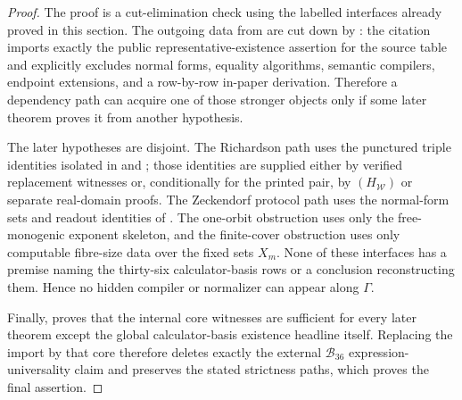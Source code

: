 \begin{proof}
The proof is a cut-elimination check using the labelled interfaces already
proved in this section.  The outgoing data from  are
cut down by : the citation imports exactly the
public representative-existence assertion for the source table and explicitly
excludes normal forms, equality algorithms, semantic compilers, endpoint
extensions, and a row-by-row in-paper derivation.  Therefore a dependency path
can acquire one of those stronger objects only if some later theorem proves it
from another hypothesis.

The later hypotheses are disjoint.  The Richardson path uses the punctured
triple identities isolated in  and
; those identities are
supplied either by verified replacement witnesses or, conditionally for the
printed pair, by \((H_{\mathcal W})\) or separate real-domain proofs.  The
Zeckendorf protocol path uses the normal-form sets and readout identities of
.  The one-orbit obstruction uses only the free-monogenic exponent
skeleton, and the finite-cover obstruction uses only computable fibre-size data
over the fixed sets \(X_m\).  None of these interfaces has a premise naming the
thirty-six calculator-basis rows or a conclusion reconstructing them.  Hence no
hidden compiler or normalizer can appear along \(\Gamma\).

Finally,  proves that the internal
core witnesses are sufficient for every later theorem except the global
calculator-basis existence headline itself.  Replacing the import by that core
therefore deletes exactly the external \(\mathcal B_{36}\) expression-universality
claim and preserves the stated strictness paths, which proves the final
assertion.
\end{proof}

